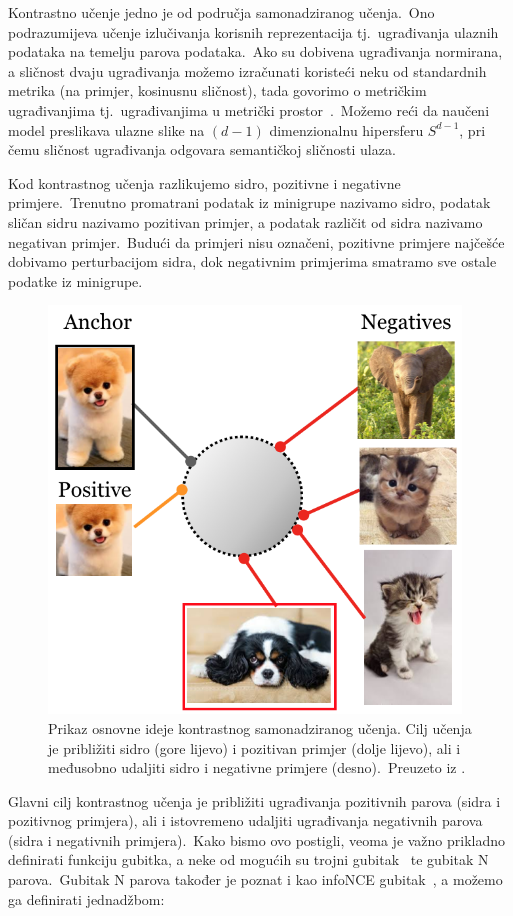 \documentclass[diplomskirad]{fer}
\begin{document}
Kontrastno učenje jedno je od područja samonadziranog učenja.\ Ono podrazumijeva učenje izlučivanja korisnih reprezentacija tj.\ ugrađivanja ulaznih podataka na temelju parova podataka.\ 
Ako su dobivena ugrađivanja normirana, a sličnost dvaju ugrađivanja možemo izračunati koristeći neku od standardnih metrika (na primjer, kosinusnu sličnost), tada govorimo o metričkim ugrađivanjima tj.\ ugrađivanjima u metrički prostor~\cite{chavez2001searching}.\ 
Možemo reći da naučeni model preslikava ulazne slike na $(d - 1)$ dimenzionalnu hipersferu $S^{d - 1}$, pri čemu sličnost ugrađivanja odgovara semantičkoj sličnosti ulaza.\
  
Kod kontrastnog učenja razlikujemo sidro, pozitivne i negativne primjere.\ Trenutno promatrani podatak iz minigrupe nazivamo sidro, podatak sličan sidru nazivamo pozitivan primjer, a podatak različit od sidra nazivamo negativan primjer.\ 
Budući da primjeri nisu označeni, pozitivne primjere najčešće dobivamo perturbacijom sidra, dok negativnim primjerima smatramo sve ostale podatke iz minigrupe.\ 

\begin{figure}[h]
  \centering
  \includegraphics[scale=1]{./Slike/ssl.png}
  \caption{Prikaz osnovne ideje kontrastnog samonadziranog učenja. Cilj učenja je približiti sidro (gore lijevo) i pozitivan primjer (dolje lijevo), ali i međusobno udaljiti sidro i negativne primjere (desno).\ Preuzeto iz \cite{khosla2020supervised}.}
  \label{fig:ssl}
\end{figure}

Glavni cilj kontrastnog učenja je približiti ugrađivanja pozitivnih parova (sidra i pozitivnog primjera), ali i istovremeno udaljiti ugrađivanja negativnih parova (sidra i negativnih primjera).\ 
Kako bismo ovo postigli, veoma je važno prikladno definirati funkciju gubitka, a neke od mogućih su trojni gubitak~\cite{schroff2015facenet} te gubitak N parova.\ 
Gubitak N parova također je poznat i kao infoNCE gubitak~\cite{oord2018representation}, a možemo ga definirati jednadžbom:
\end{document}
